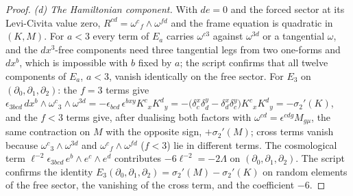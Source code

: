 \documentclass[11pt]{article}
\theoremstyle{definition}
\theoremstyle{plain}
\begin{document}
\begin{proof}
\emph{(d) The Hamiltonian component.} With $de = 0$ and the forced sector at its Levi-Civita value zero, $R^{cd} = \omega^{c}{}_{f}\wedge\omega^{fd}$ and the frame equation is quadratic in $(K, M)$. For $a < 3$ every term of $E_a$ carries $\omega^{c3}$ against $\omega^{3d}$ or a tangential $\omega$, and the $dx^3$-free components need three tangential legs from two one-forms and $dx^b$, which is impossible with $b$ fixed by $a$; the script confirms that all twelve components of $E_a$, $a<3$, vanish identically on the free sector. For $E_3$ on $(\partial_0,\partial_1,\partial_2)$: the $f = 3$ terms give $\epsilon_{3bcd}\,dx^b\wedge\omega^{c}{}_{3}\wedge\omega^{3d} = -\epsilon_{bcd}\,\epsilon^{bxy}K^{c}{}_{x}K^{d}{}_{y} = -\bigl(\delta^x_c\delta^y_d - \delta^x_d\delta^y_c\bigr)K^{c}{}_{x}K^{d}{}_{y} = -\sigma_2'(K)$, and the $f < 3$ terms give, after dualising both factors with $\omega^{cd} = \epsilon^{cdg}M_{g\mu}$, the same contraction on $M$ with the opposite sign, $+\sigma_2'(M)$; cross terms vanish because $\omega^{c}{}_{3}\wedge\omega^{3d}$ and $\omega^{c}{}_{f}\wedge\omega^{fd}$ ($f<3$) lie in different terms. The cosmological term $\ell^{-2}\epsilon_{3bcd}\,e^b\wedge e^c\wedge e^d$ contributes $-6\ell^{-2} = -2\Lambda$ on $(\partial_0,\partial_1,\partial_2)$. The script confirms the identity $E_3(\partial_0,\partial_1,\partial_2) = \sigma_2'(M) - \sigma_2'(K)$ on random elements of the free sector, the vanishing of the cross term, and the coefficient $-6$.

\end{proof}
\end{document}
